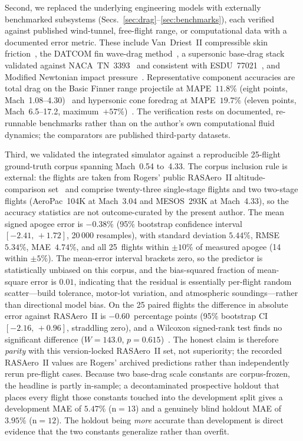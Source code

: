 Second, we replaced the underlying engineering models with externally
benchmarked subsystems (Secs.~\ref{sec:drag}--\ref{sec:benchmarks}), each
verified against published wind-tunnel, free-flight range, or computational
data with a documented error metric. These include Van~Driest~II compressible
skin friction~\cite{hopkins1971}, the DATCOM fin wave-drag
method~\cite{datcom1978}, a supersonic base-drag stack validated against
NACA~TN~3393~\cite{chapman1955} and consistent with ESDU~77021~\cite{esdu77021},
and Modified Newtonian impact pressure~\cite{anderson2006}. Representative
component accuracies are total drag on the Basic Finner range
projectile at MAPE~$11.8\%$ (eight points, Mach~1.08--4.30)~\cite{dupuis1997}
and hypersonic cone foredrag at MAPE~$19.7\%$ (eleven points, Mach~6.5--17.2,
maximum~$+57\%$)~\cite{grabow1965}. The verification rests on documented,
re-runnable benchmarks rather than on the author's own computational fluid
dynamics; the comparators are published third-party datasets.

Third, we validated the integrated simulator against a reproducible 25-flight
ground-truth corpus spanning Mach~0.54 to~4.33. The corpus inclusion rule is
external: the flights are taken from Rogers' public RASAero~II
altitude-comparison set~\cite{rogers2015,rogers_rasaero_alt} and comprise
twenty-three single-stage flights and two two-stage flights (AeroPac~104K at
Mach~3.04 and MESOS~293K at Mach~4.33), so the accuracy statistics are not
outcome-curated by the present author. The mean signed apogee error is
$-0.38\%$ (95\% bootstrap confidence interval $[-2.41,\,+1.72]$, 20\,000
resamples), with standard deviation $5.44\%$, RMSE~$5.34\%$, MAE~$4.74\%$, and
all 25~flights within $\pm10\%$ of measured apogee (14 within $\pm5\%$). The
mean-error interval brackets zero, so the predictor is statistically unbiased on
this corpus, and the bias-squared fraction of mean-square error is $0.01$,
indicating that the residual is essentially per-flight random scatter---build
tolerance, motor-lot variation, and atmospheric soundings---rather than
directional model bias. On the 25 paired flights the difference in absolute
error against RASAero~II is $-0.60$~percentage points (95\% bootstrap CI
$[-2.16,\,+0.96]$, straddling zero), and a Wilcoxon signed-rank test finds no
significant difference ($W=143.0$, $p=0.615$)~\cite{wilcoxon1945}. The honest
claim is therefore \emph{parity} with this version-locked RASAero~II set, not
superiority; the recorded RASAero~II values are Rogers' archived predictions
rather than independently rerun pre-flight cases. Because two base-drag scale
constants are corpus-frozen, the headline is partly in-sample; a decontaminated
prospective holdout that places every flight those constants touched into the
development split gives a development MAE of $5.47\%$ (n$=13$) and a genuinely
blind holdout MAE of $3.95\%$ (n$=12$). The holdout being \emph{more} accurate
than development is direct evidence that the two constants generalize rather
than overfit.

